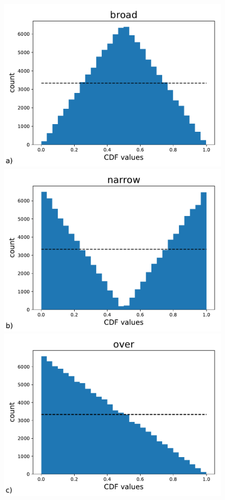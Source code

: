\documentclass[BCOR=1mm, DIV=calc,10pt,
twoside=true,
twocolumn,
headings=normal]{scrartcl}
\begin{document}
\begin{figure}
\begin{center}
\includegraphics[scale=0.25]{cdf_truth_broad}
\includegraphics[scale=0.25]{cdf_truth_narrow}
\includegraphics[scale=0.25]{cdf_truth_over}

\end{center}
\end{figure}
\end{document}

